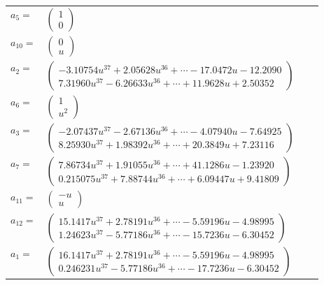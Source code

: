 \documentclass[1p]{elsarticle_modified}
\theoremstyle{definition}
\begin{document}
\begin{tabular}{m{7pt} m{180pt} m{7pt} m{180pt} }
\flushright $a_{5}=$&$\begin{pmatrix}1\\0\end{pmatrix}$ \\
\flushright $a_{10}=$&$\begin{pmatrix}0\\u\end{pmatrix}$ \\
\flushright $a_{2}=$&$\begin{pmatrix}-3.10754 u^{37}+2.05628 u^{36}+\cdots-17.0472 u-12.2090\\7.31960 u^{37}-6.26633 u^{36}+\cdots+11.9628 u+2.50352\end{pmatrix}$ \\
\flushright $a_{6}=$&$\begin{pmatrix}1\\u^2\end{pmatrix}$ \\
\flushright $a_{3}=$&$\begin{pmatrix}-2.07437 u^{37}-2.67136 u^{36}+\cdots-4.07940 u-7.64925\\8.25930 u^{37}+1.98392 u^{36}+\cdots+20.3849 u+7.23116\end{pmatrix}$ \\
\flushright $a_{7}=$&$\begin{pmatrix}7.86734 u^{37}+1.91055 u^{36}+\cdots+41.1286 u-1.23920\\0.215075 u^{37}+7.88744 u^{36}+\cdots+6.09447 u+9.41809\end{pmatrix}$ \\
\flushright $a_{11}=$&$\begin{pmatrix}- u\\u\end{pmatrix}$ \\
\flushright $a_{12}=$&$\begin{pmatrix}15.1417 u^{37}+2.78191 u^{36}+\cdots-5.59196 u-4.98995\\1.24623 u^{37}-5.77186 u^{36}+\cdots-15.7236 u-6.30452\end{pmatrix}$ \\
\flushright $a_{1}=$&$\begin{pmatrix}16.1417 u^{37}+2.78191 u^{36}+\cdots-5.59196 u-4.98995\\0.246231 u^{37}-5.77186 u^{36}+\cdots-17.7236 u-6.30452\end{pmatrix}$ \\

\end{tabular}
\end{document}

